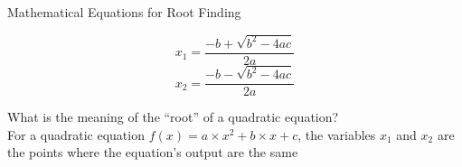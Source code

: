 \documentclass[14pt,aspectratio=169]{beamer}
\begin{document}
%
\begin{frame}{Mathematical Equations for Root Finding}
  \vspace*{-.5in}
  \begin{center}
    \fontsize{20}{30}\selectfont
    \begin{equation*}
      x_1=\frac{-b+\sqrt{b^2-4ac}}{2a}
    \end{equation*}
    \begin{equation*}
      x_2=\frac{-b-\sqrt{b^2-4ac}}{2a}
    \end{equation*}
  \end{center}
  \vspace{.05ex}
  \begin{center}
    \small What is the meaning of the ``root'' of a quadratic equation? \\
    \small For a quadratic equation $f(x)= a \times x^2 + b \times x +c$, the
    variables $x_1$ and $x_2$ are the points where the equation's output are
    the same\\
  \end{center}
\end{frame}
\end{document}
